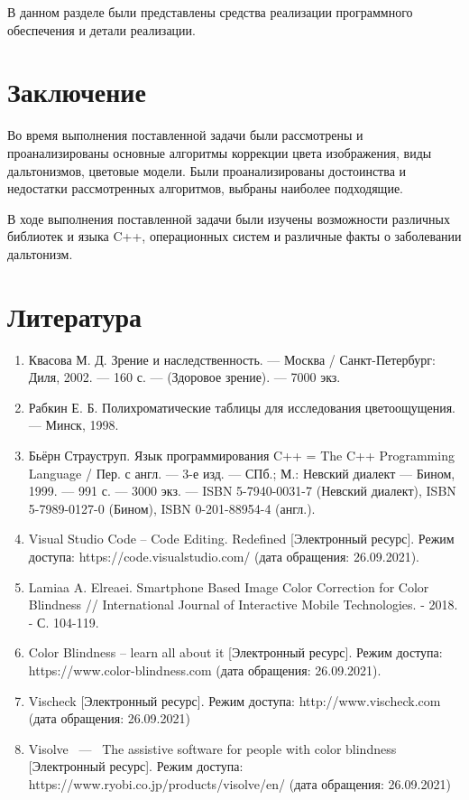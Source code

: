\documentclass[a4paper,14pt, unknownkeysallowed]{extreport}
\begin{document}
    В данном разделе были представлены средства реализации программного обеспечения и детали реализации.

    \chapter*{Заключение}

    Во время выполнения поставленной задачи были рассмотрены и проанализированы основные алгоритмы коррекции цвета изображения, виды дальтонизмов, цветовые модели. Были проанализированы достоинства и недостатки рассмотренных алгоритмов, выбраны наиболее подходящие.

    В ходе выполнения поставленной задачи были изучены возможности различных библиотек и языка C++, операционных систем и различные факты о заболевании дальтонизм.

    \chapter*{Литература}

    \begin{enumerate}
        \item Квасова М. Д. Зрение и наследственность. — Москва / Санкт-Петербург: Диля, 2002. — 160 с. — (Здоровое зрение). — 7000 экз.
        \item Рабкин Е. Б. Полихроматические таблицы для исследования цветоощущения. — Минск, 1998.
        \item Бьёрн Страуструп. Язык программирования C++ = The C++ Programming Language / Пер. с англ. — 3-е изд. — СПб.; М.: Невский диалект — Бином, 1999. — 991 с. — 3000 экз. — ISBN 5-7940-0031-7 (Невский диалект), ISBN 5-7989-0127-0 (Бином), ISBN 0-201-88954-4 (англ.).
        \item Visual Studio Code – Code Editing. Redefined [Электронный ресурс]. Режим доступа: https://code.visualstudio.com/ (дата обращения: 26.09.2021).
        \item Lamiaa A. Elreaei. Smartphone Based Image Color Correction for Color Blindness // International Journal of Interactive Mobile Technologies. - 2018. - С. 104-119.
        \item Color Blindness – learn all about it [Электронный ресурс]. Режим доступа: https://www.color-blindness.com (дата обращения: 26.09.2021).
        \item Vischeck [Электронный ресурс]. Режим доступа: http://www.vischeck.com (дата обращения: 26.09.2021)
        \item Visolve ~---~ The assistive software for people with color blindness [Электронный ресурс]. Режим доступа: https://www.ryobi.co.jp/products/visolve/en/ (дата обращения: 26.09.2021)
    \end{enumerate}
\end{document}

